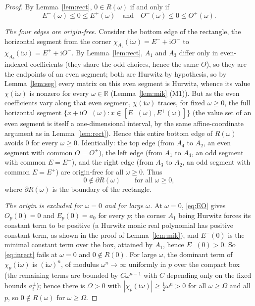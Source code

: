 \documentclass[12pt]{article}
\theoremstyle{definition}
\newcommand{\jj}{\mathrm{i}}
\begin{document}
\begin{proof}
By Lemma~\ref{lem:rect}, $0\in R(\omega)$ if and only if
\begin{equation}\label{eq:inrect}
E^-(\omega)\le0\le E^+(\omega)\quad\text{and}\quad O^-(\omega)\le0\le O^+(\omega).
\end{equation}

\emph{The four edges are origin-free.} Consider the bottom edge of the rectangle, the
horizontal segment from the corner $\chi_{A_1}(\jj\omega)=E^-+\jj O^-$ to
$\chi_{A_3}(\jj\omega)=E^++\jj O^-$. By Lemma~\ref{lem:rect}, $A_1$ and $A_3$ differ only
in even-indexed coefficients (they share the odd choices, hence the same $O$), so they are
the endpoints of an even segment; both are Hurwitz by hypothesis, so by
Lemma~\ref{lem:seg} every matrix on this even segment is Hurwitz, whence its value
$\chi(\jj\omega)$ is nonzero for every $\omega\in\mathbb R$ (Lemma~\ref{lem:mik} (M1)).
But as the even coefficients vary along that even segment, $\chi(\jj\omega)$ traces, for
fixed $\omega\ge0$, the full horizontal segment
$\{x+\jj O^-(\omega):x\in[E^-(\omega),E^+(\omega)]\}$ (the value set of an even segment is
itself a one-dimensional interval, by the same affine-coordinate argument as in
Lemma~\ref{lem:rect}). Hence this entire bottom edge of $R(\omega)$ avoids $0$ for every
$\omega\ge0$. Identically: the top edge (from $A_4$ to $A_2$, an even segment with common
$O=O^+$), the left edge (from $A_1$ to $A_4$, an odd segment with common $E=E^-$), and the
right edge (from $A_3$ to $A_2$, an odd segment with common $E=E^+$) are origin-free for
all $\omega\ge0$. Thus
\begin{equation}\label{eq:edgefree}
0\notin\partial R(\omega)\qquad\text{for all }\omega\ge0,
\end{equation}
where $\partial R(\omega)$ is the boundary of the rectangle.

\emph{The origin is excluded for $\omega=0$ and for large $\omega$.} At $\omega=0$,
\eqref{eq:EO} gives $O_p(0)=0$ and $E_p(0)=a_0$ for every $p$; the corner $A_1$ being
Hurwitz forces its constant term to be positive (a Hurwitz monic real polynomial has
positive constant term, as shown in the proof of Lemma~\ref{lem:mik}), and $E^-(0)$ is the
minimal constant term over the box, attained by $A_1$, hence $E^-(0)>0$. So
\eqref{eq:inrect} fails at $\omega=0$ and $0\notin R(0)$. For large $\omega$, the dominant
term of $\chi_p(\jj\omega)$ is $(\jj\omega)^n$, of modulus $\omega^n\to\infty$ uniformly in
$p$ over the compact box (the remaining terms are bounded by
$C\omega^{n-1}$ with $C$ depending only on the fixed bounds $a_i^\pm$); hence there is
$\Omega>0$ with $|\chi_p(\jj\omega)|\ge \tfrac12\omega^n>0$ for all $\omega\ge\Omega$ and
all $p$, so $0\notin R(\omega)$ for $\omega\ge\Omega$.


\end{proof}
\end{document}

